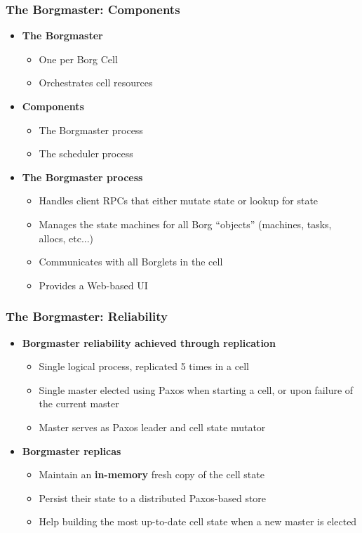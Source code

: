 \begin{frame}
\frametitle{The Borgmaster: Components}
\begin{itemize}
	\item {\bf The Borgmaster}
	\begin{itemize}
		\item One per Borg Cell
		\item Orchestrates cell resources
	\end{itemize}

\vspace{20pt}

	\item {\bf Components}
	\begin{itemize}
		\item The Borgmaster process
		\item The scheduler process
	\end{itemize}

\vspace{20pt}

	\item {\bf The Borgmaster process}
	\begin{itemize}
		\item Handles client RPCs that either mutate state or lookup for state
		\item Manages the state machines for all Borg ``objects'' (machines, tasks, allocs, etc...)
		\item Communicates with all Borglets in the cell
		\item Provides a Web-based UI
	\end{itemize}
\end{itemize}
\end{frame}

\begin{frame}
\frametitle{The Borgmaster: Reliability}
\begin{itemize}
	\item {\bf Borgmaster reliability achieved through replication}
	\begin{itemize}
		\item Single logical process, replicated 5 times in a cell
		\item Single master elected using Paxos when starting a cell, or upon failure of the current master
		\item Master serves as Paxos leader and cell state mutator
	\end{itemize}

\vspace{20pt}

	\item {\bf Borgmaster replicas}
	\begin{itemize}
		\item Maintain an {\bf in-memory} fresh copy of the cell state
		\item Persist their state to a distributed Paxos-based store
		\item Help building the most up-to-date cell state when a new master is elected
	\end{itemize}
\end{itemize}
\end{frame}

